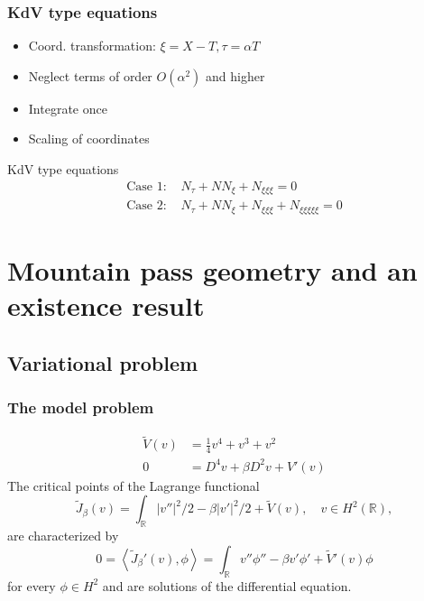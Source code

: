 \documentclass[9pt, english]{beamer}
\theoremstyle{definition}
\newcommand{\R}{\mathbb{R}}                     %
\begin{document}
\begin{frame}
\frametitle{KdV type equations}
  \begin{itemize}
   \item Coord. transformation: $\xi=X-T,\tau=\alpha T$
   \item Neglect terms of order $O(\alpha^2)$ and higher
   \item Integrate once
   \item Scaling of coordinates
 \end{itemize}
\begin{block}{KdV type equations}
\begin{equation*}\begin{aligned}
\mbox{Case 1: } &N_\tau + NN_\xi + N_{\xi\xi\xi} = 0 \\
\mbox{Case 2: } &N_\tau + NN_\xi + N_{\xi\xi\xi} +
N_{\xi\xi\xi\xi\xi} = 0
\end{aligned}\end{equation*}
\end{block}
\end{frame}




























\section{Mountain pass geometry and an existence result }


\subsection{Variational problem}
\begin{frame}
\frametitle{The model problem}
\begin{align*}
\tilde V(v) &= \frac14 v^4 + v^3 + v^2\\
0 &= D^4 v + \beta D^2 v + V'(v)
\end{align*}
The critical points of the Lagrange functional
\[
\tilde J_\beta(v) = \int_\R |v''|^2 / 2 - \beta |v'|^2 / 2 + \tilde
V(v), \quad v \in H^2(\R),
\]
are characterized by
\[
0 = \left\langle \tilde J_\beta'(v), \phi \right\rangle = \int_\R
v'' \phi'' - \beta v' \phi' + \tilde V'(v) \phi
\]
for every $\phi \in H^2$ and are solutions of the differential
equation.
\end{frame}
\end{document}
